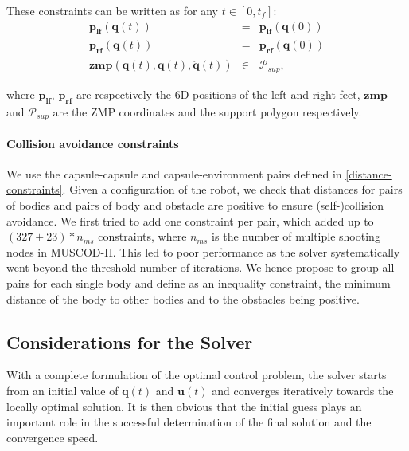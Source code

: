 These constraints can be written as for any $t\in[0,t_{f}]$:
\begin{equation}
  \begin{array}{rcl}
    \mathbf{p_{lf}}(\mathbf{q}(t)) & = & \mathbf{p_{lf}}(\mathbf{q}(0)) \\
    \mathbf{p_{rf}}(\mathbf{q}(t)) & = & \mathbf{p_{rf}}(\mathbf{q}(0)) \\
    \mathbf{zmp} (\mathbf{q}(t), \mathbf{\dot{q}}(t), \mathbf{\ddot{q}}(t)) & \in & \mathcal{P}_{sup},
  \end{array}
  \label{dynamic-constraints}
\end{equation}

where $\mathbf{p_{lf}}$, $\mathbf{p_{rf}}$ are respectively the 6D
positions of the left and right feet, $\mathbf{zmp}$ and
$\mathcal{P}_{sup}$ are the ZMP coordinates and the support polygon
respectively.

\paragraph{Collision avoidance constraints}
We use the capsule-capsule and capsule-environment pairs defined in
\ref{distance-constraints}. Given a configuration \config{} of the
robot, we check that distances for pairs of bodies and pairs of body
and obstacle are positive to ensure (self-)collision avoidance. We
first tried to add one constraint per pair, which added up to $(327 +
23)*n_{ms}$ constraints, where $n_{ms}$ is the number of multiple
shooting nodes in \textsc{MUSCOD-II}. This led to poor performance as
the solver systematically went beyond the threshold number of
iterations. We hence propose to group all pairs for each single body
and define as an inequality constraint, the minimum distance of the
body to other bodies and to the obstacles being positive.

\subsection{Considerations for the Solver}
\label{initial-guess}
With a complete formulation of the optimal control problem, the solver
starts from an initial value of $\mathbf{q}(t)$ and $\mathbf{u}(t)$
and converges iteratively towards the locally optimal solution. It is
then obvious that the initial guess plays an important role in the
successful determination of the final solution and the convergence
speed.

